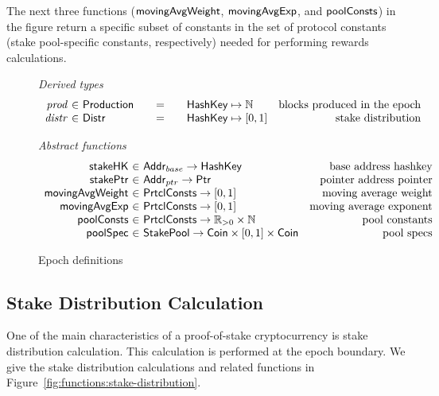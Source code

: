 The next three functions ($\mathsf{movingAvgWeight}$, $\mathsf{movingAvgExp}$, and
$\mathsf{poolConsts}$) in the figure return a specific subset of constants
in the set of protocol constants (stake pool-specific constants, respectively)
needed for performing rewards calculations.

\begin{figure}[htb]
  \emph{Derived types}
  \begin{equation*}
    \begin{array}{r@{~\in~}l@{\qquad=\qquad}lr}
      \var{prod}
      & \Production
      & \HashKey \mapsto \mathbb{N}
      & \text{blocks produced in the epoch} \\
      \var{distr}
      & \Distr
      & \HashKey \mapsto [0,1]
      & \text{stake distribution} \\
    \end{array}
  \end{equation*}


  \emph{Abstract functions}
  \begin{equation*}
    \begin{array}{r@{~\in~}lr}
      \fun{stakeHK} & \Addr_{base} \to \HashKey
      & \text{base address hashkey}\\
      \fun{stakePtr} & \Addr_{ptr} \to \Ptr
      & \text{pointer address pointer}\\
      \fun{movingAvgWeight} & \PrtclConsts \to [0, 1]
      & \text{moving average weight}\\
      \fun{movingAvgExp} & \PrtclConsts \to [0, 1]
      & \text{moving average exponent}\\
      \fun{poolConsts} & \PrtclConsts \to \mathbb{R}_{>0}\times\mathbb{N}
      & \text{pool constants}\\
      \fun{poolSpec} & \StakePool \to \Coin\times [0,1] \times \Coin
      & \text{pool specs}\\
    \end{array}
  \end{equation*}
  \caption{Epoch definitions}
  \label{fig:epoch-defs}
\end{figure}

\subsection{Stake Distribution Calculation}
\label{sec:stake-dist}

One of the main characteristics of a proof-of-stake cryptocurrency is stake
distribution calculation. This calculation is performed at the epoch boundary.
We give the stake distribution calculations and related functions in
Figure~\ref{fig:functions:stake-distribution}.

